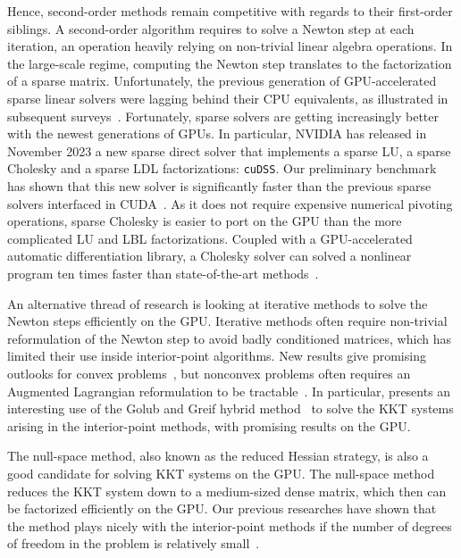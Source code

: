 Hence, second-order methods remain competitive with regards to their first-order
siblings. A second-order algorithm requires to solve a Newton step at each
iteration, an operation heavily relying on non-trivial linear algebra operations.
In the large-scale regime, computing the Newton step translates to the
factorization of a sparse matrix.
Unfortunately, the previous generation of GPU-accelerated sparse linear
solvers were lagging behind their CPU equivalents, as illustrated in
subsequent surveys~\cite{tasseff2019exploring,swirydowicz2021linear}.
Fortunately, sparse solvers are getting increasingly better with the newest
generations of GPUs. In particular, NVIDIA has released in November 2023
a new sparse direct solver that implements a sparse LU, a sparse Cholesky
and a sparse LDL factorizations: {\tt cuDSS}. Our
preliminary benchmark has shown that this new solver is significantly
faster than the previous sparse solvers interfaced in CUDA~\cite{swirydowicz2021linear}.
As it does not require expensive numerical pivoting operations, sparse Cholesky
is easier to port on the GPU than the more complicated LU and LBL factorizations.
Coupled with a GPU-accelerated automatic differentiation library, a Cholesky
solver can solved a nonlinear program ten times faster than state-of-the-art
methods~\cite{shin2023accelerating}.

An alternative thread of research is looking at iterative methods to solve the Newton steps efficiently on the GPU.
Iterative methods often require non-trivial reformulation of the Newton step to avoid
badly conditioned matrices, which has limited their use inside interior-point
algorithms. New results give promising outlooks for convex problems~\cite{ghannad2022linear},
but nonconvex problems often requires an Augmented Lagrangian reformulation
to be tractable~\cite{cao2016augmented,regev2023hykkt}. In particular,
\cite{regev2023hykkt} presents an interesting use of the Golub and Greif
hybrid method~\cite{golub2003solving} to solve the KKT systems arising in
the interior-point methods, with promising results on the GPU.

The null-space method, also known as the reduced Hessian strategy,
is also a good candidate for solving KKT systems on the GPU.
The null-space method reduces the KKT system down to
a medium-sized dense matrix, which then can be factorized efficiently on the GPU.
Our previous researches have shown that the method plays nicely with the interior-point
methods if the number of degrees of freedom in the problem is relatively small~\cite{pacaud2022condensed}.

